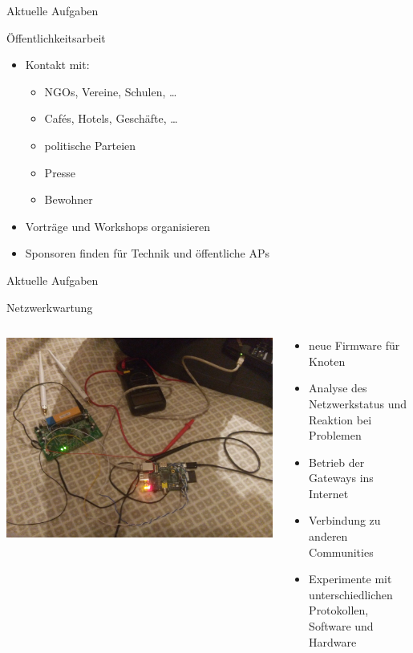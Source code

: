 \documentclass[handout, 10pt]{beamer}
\begin{document}
\begin{frame}{Aktuelle Aufgaben}
	\begin{center}
		\large Öffentlichkeitsarbeit
		\vfill
	\end{center}
	\begin{itemize}[<+->]
		\item Kontakt mit:
		\begin{itemize}[<+->]
			\item NGOs, Vereine, Schulen, \ldots
			\item Cafés, Hotels, Geschäfte, \ldots
			\item politische Parteien
			\item Presse
			\item Bewohner
		\end{itemize}	
		\item Vorträge und Workshops organisieren
		\item Sponsoren finden für Technik und öffentliche APs
	\end{itemize}
\end{frame}

\begin{frame}{Aktuelle Aufgaben}
	\begin{center}
		\large Netzwerkwartung
		\vfill
	\end{center}
	\begin{columns}[T]
		\begin{column}{5cm}
			\includegraphics[width=\textwidth]{images/disassemble}
		\end{column}
		\begin{column}{7cm}
			\begin{itemize}[<+->]
				\item neue Firmware für Knoten
				\item Analyse des Netzwerkstatus und Reaktion bei Problemen
				\item Betrieb der Gateways ins Internet
				\item Verbindung zu anderen Communities
				\item Experimente mit unterschiedlichen Protokollen, Software und Hardware
			\end{itemize}
		\end{column}
	\end{columns}
\end{frame}
\end{document}
